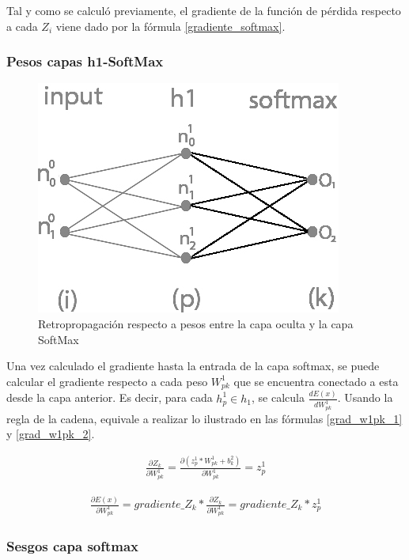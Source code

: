 Tal y como se calculó previamente, el gradiente de la función de pérdida respecto a cada $Z_i$ viene dado por la fórmula \ref{gradiente_softmax}.


\subsubsection{Pesos capas h1-SoftMax}

\begin{figure}[H]
	\centering
	\includegraphics[scale=0.35]{imagenes/nn_1_capa_pesos_h1_output.jpg}  
	\caption{Retropropagación respecto a pesos entre la capa oculta y la capa SoftMax}
	\label{fig:nn_1_pesos_h1_output}
\end{figure}

Una vez calculado el gradiente hasta la entrada de la capa softmax, se puede calcular el gradiente respecto a cada peso $W^1_{pk}$ que se encuentra conectado a esta desde la capa anterior. Es decir, para cada $h^1_p\in h_1$, se calcula $\frac{dE(x)}{dW^1_{pk}}$. Usando la regla de la cadena, equivale a realizar lo ilustrado en las fórmulas \ref{grad_w1pk_1} y \ref{grad_w1pk_2}.

\begin{gather}
	\frac{\partial Z_k}{\partial W^1_{pk}} = \frac{\partial (z^1_p * W^1 _{pk}+ b^2_k)}{\partial W^1_{pk }} = z^1_p
	\label{grad_w1pk_1}
\end{gather}

\begin{gather}
	\frac{\partial E(x)}{\partial W^1_{pk }} =  gradiente\_Z_k * \frac{\partial Z_k}{\partial W^1_{pk }} = gradiente\_Z_k * z^1_p
	\label{grad_w1pk_2}
\end{gather}

\subsubsection{Sesgos capa softmax}

